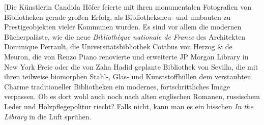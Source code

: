 \documentclass[output=paper]{langscibook}
\begin{document}
{[}Die Künstlerin Candida Höfer feierte mit ihren monumentalen
Fotografien von Bibliotheken gerade großen Erfolg, als Bibliotheksneu-
und umbauten zu Prestigeobjekten vieler Kommunen wurden. Es sind vor
allem die modernen Bücherpaläste, wie die neue \emph{Bibliothèque
nationale de France} des Architekten Dominique Perrault, die
Universitätsbibliothek Cottbus von Herzog \& de Meuron, die von Renzo
Piano renovierte und erweiterte JP Morgan Library in New York Freie oder
die von Zaha Hadid geplante Bibliothek von Sevilla, die mit ihren
teilweise biomorphen Stahl-, Glas- und Kunststoffhüllen dem verstaubten
Charme traditioneller Bibliotheken ein modernes, fortschrittliches Image
verpassen. Ob es dort wohl auch noch nach alten englischen Romanen,
russischem Leder und Holzpflegepolitur riecht? Falls nicht, kann man es
ein bisschen \emph{In the Library} in die Luft sprühen.

\end{document}
